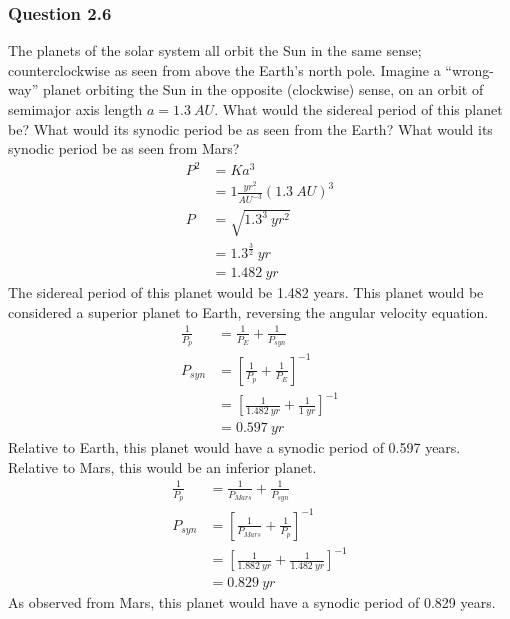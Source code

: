 \documentclass{math}
\begin{document}
\subsubsection*{Question 2.6}
The planets of the solar system all orbit the Sun in the same sense;
counterclockwise as seen from above the Earth's north pole. Imagine a
``wrong-way'' planet orbiting the Sun in the opposite (clockwise) sense, on an
orbit of semimajor axis length \( a = 1.3~AU \). What would the sidereal period
of this planet be? What would its synodic period be as seen from the Earth?
What would its synodic period be as seen from Mars?
\begin{align*}
  P^2 &= Ka^3 \\
  &= 1\frac{yr^2}{AU^{-3}}(1.3~AU)^3 \\
  P &= \sqrt{1.3^3~yr^2} \\
  &= 1.3^{\frac{3}{2}}~yr \\
  &= 1.482~yr
\end{align*}
The sidereal period of this planet would be 1.482 years. This planet would
be considered a superior planet to Earth, reversing the angular velocity
equation.
\begin{align*}
  \frac{1}{P_p} &= \frac{1}{P_E}+\frac{1}{P_{syn}} \\
  P_{syn} &= \left[\frac{1}{P_p}+\frac{1}{P_E}\right]^{-1} \\
  &= \left[\frac{1}{1.482~yr}+\frac{1}{1~yr}\right]^{-1} \\
  &= 0.597~yr
\end{align*}
Relative to Earth, this planet would have a synodic period of 0.597 years.
Relative to Mars, this would be an inferior planet.
\begin{align*}
  \frac{1}{P_p} &= \frac{1}{P_{Mars}}+\frac{1}{P_{syn}} \\
  P_{syn} &= \left[\frac{1}{P_{Mars}}+\frac{1}{P_p}\right]^{-1} \\
  &= \left[\frac{1}{1.882~yr}+\frac{1}{1.482~yr}\right]^{-1} \\
  &= 0.829~yr
\end{align*}
As observed from Mars, this planet would have a synodic period of 0.829 years.
\end{document}
